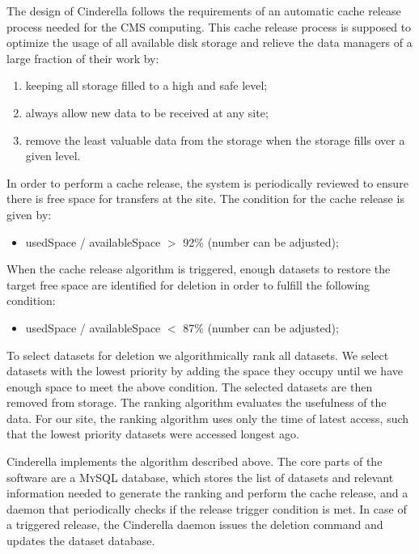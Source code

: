 The design of Cinderella follows the requirements of an automatic cache release process needed for the 
CMS computing. This cache release process is supposed to optimize the usage of all 
available disk storage and relieve the data managers of a large fraction of their work by:

\begin{enumerate}
	\item keeping all storage filled to a high and safe level;
	\item always allow new data to be received at any site;
	\item remove the least valuable data from the storage when the storage fills over a given level.
\end{enumerate}

In order to perform a cache release, the system is periodically reviewed to ensure there is free space 
for transfers at the site. The condition for the cache release is given by:

\begin{itemize}
	\item usedSpace / availableSpace $>$ 92\% (number can be adjusted);
\end{itemize}

When the cache release algorithm is triggered, enough datasets to restore the target free space are identified
for deletion in order to fulfill the following condition:

\begin{itemize}
	\item usedSpace / availableSpace $<$ 87\% (number can be adjusted);
\end{itemize}

To select datasets for deletion we algorithmically rank all datasets. We select datasets with the lowest priority
by adding the space they occupy until we have enough space to meet the above condition. The selected datasets are 
then removed from storage. The ranking algorithm evaluates the usefulness of the data. For our site, the ranking 
algorithm uses only the time of latest access, such that the lowest priority datasets were accessed longest ago. 

Cinderella implements the algorithm described above. The core parts of the software are
a \textsc{MySQL} database, which stores the list of datasets and relevant information needed to generate the ranking
and perform the cache release, and a daemon that periodically checks if the release trigger condition is met.
In case of a triggered release, the Cinderella daemon issues the deletion command and updates the dataset database.

